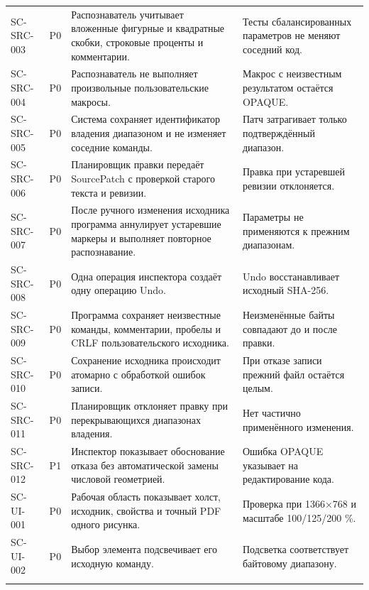 \documentclass[11pt,a4paper,oneside]{scrreprt}
\begin{document}
\begin{longtable}{@{}>{\raggedright\arraybackslash}p{2.35cm}>{\raggedright\arraybackslash}p{0.75cm}>{\raggedright\arraybackslash}p{6.35cm}>{\raggedright\arraybackslash}p{5.2cm}@{}}
\footnotesize SC-SRC-003 & P0 & Распознаватель учитывает вложенные фигурные и квадратные скобки, строковые проценты и комментарии. & Тесты сбалансированных параметров не меняют соседний код. \\ \addlinespace[2pt]
\footnotesize SC-SRC-004 & P0 & Распознаватель не выполняет произвольные пользовательские макросы. & Макрос с неизвестным результатом остаётся OPAQUE. \\ \addlinespace[2pt]
\footnotesize SC-SRC-005 & P0 & Система сохраняет идентификатор владения диапазоном и не изменяет соседние команды. & Патч затрагивает только подтверждённый диапазон. \\ \addlinespace[2pt]
\footnotesize SC-SRC-006 & P0 & Планировщик правки передаёт SourcePatch с проверкой старого текста и ревизии. & Правка при устаревшей ревизии отклоняется. \\ \addlinespace[2pt]
\footnotesize SC-SRC-007 & P0 & После ручного изменения исходника программа аннулирует устаревшие маркеры и выполняет повторное распознавание. & Параметры не применяются к прежним диапазонам. \\ \addlinespace[2pt]
\footnotesize SC-SRC-008 & P0 & Одна операция инспектора создаёт одну операцию Undo. & Undo восстанавливает исходный SHA-256. \\ \addlinespace[2pt]
\footnotesize SC-SRC-009 & P0 & Программа сохраняет неизвестные команды, комментарии, пробелы и CRLF пользовательского исходника. & Неизменённые байты совпадают до и после правки. \\ \addlinespace[2pt]
\footnotesize SC-SRC-010 & P0 & Сохранение исходника происходит атомарно с обработкой ошибок записи. & При отказе записи прежний файл остаётся целым. \\ \addlinespace[2pt]
\footnotesize SC-SRC-011 & P0 & Планировщик отклоняет правку при перекрывающихся диапазонах владения. & Нет частично применённого изменения. \\ \addlinespace[2pt]
\footnotesize SC-SRC-012 & P1 & Инспектор показывает обоснование отказа без автоматической замены числовой геометрией. & Ошибка OPAQUE указывает на редактирование кода. \\ \addlinespace[2pt]
\footnotesize SC-UI-001 & P0 & Рабочая область показывает холст, исходник, свойства и точный PDF одного рисунка. & Проверка при 1366×768 и масштабе 100/125/200 \%. \\ \addlinespace[2pt]
\footnotesize SC-UI-002 & P0 & Выбор элемента подсвечивает его исходную команду. & Подсветка соответствует байтовому диапазону. \\ \addlinespace[2pt]

\end{longtable}
\end{document}
